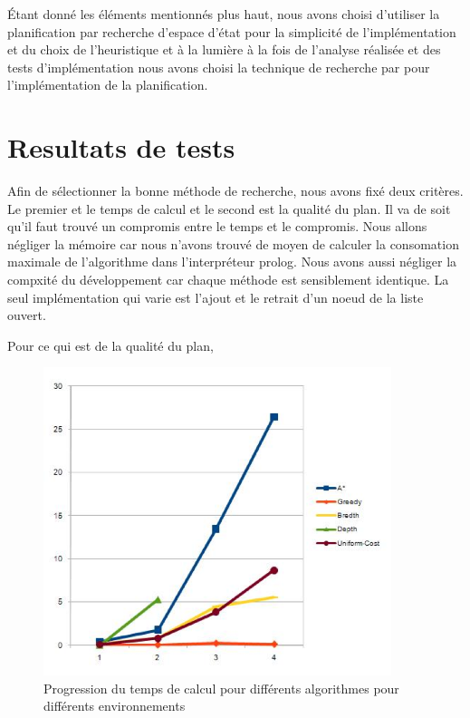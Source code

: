 \documentclass[12pt,english,frenchb,letterpaper]{article}
\begin{document}
Étant donné les éléments mentionnés plus haut, nous avons choisi d'utiliser la planification par recherche d'espace d'état pour la simplicité de l'implémentation et du choix de l'heuristique et à la lumière à la fois de l'analyse réalisée et des tests d'implémentation nous avons choisi la technique de recherche par %
pour l'implémentation de la planification.

\section{Resultats de tests}



Afin de sélectionner la bonne méthode de recherche, nous avons fixé deux critères. Le premier et le temps de calcul et le second est la qualité du plan. Il va de soit qu'il faut trouvé un compromis entre le temps et le compromis. Nous allons négliger la mémoire car nous n'avons trouvé de moyen de calculer la consomation maximale de l'algorithme dans l'interpréteur prolog. Nous avons aussi négliger la compxité du développement car chaque méthode est sensiblement identique. La seul implémentation qui varie est l'ajout et le retrait d'un noeud de la liste ouvert.

Pour ce qui est de la qualité du plan, 

\begin{figure}[!h] %
\includegraphics[width=4in]{resultats-planif} %
\caption{Progression du temps de calcul pour différents algorithmes pour différents environnements} 
\end{figure}
\end{document}

